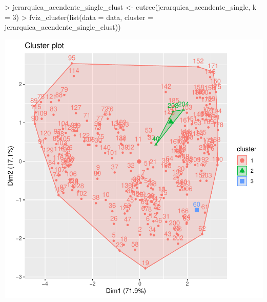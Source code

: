 \documentclass [a4paper] {article}
\begin{document}
\begin{center}
\begin{Schunk}
\begin{Sinput}
> jerarquica_acendente_single_clust <- cutree(jerarquica_acendente_single, k = 3)
> fviz_cluster(list(data = data, cluster = jerarquica_acendente_single_clust))
\end{Sinput}
\end{Schunk}
\includegraphics{entrega-jerarquica_acendente_single_plot}
\end{center}
\end{document}
